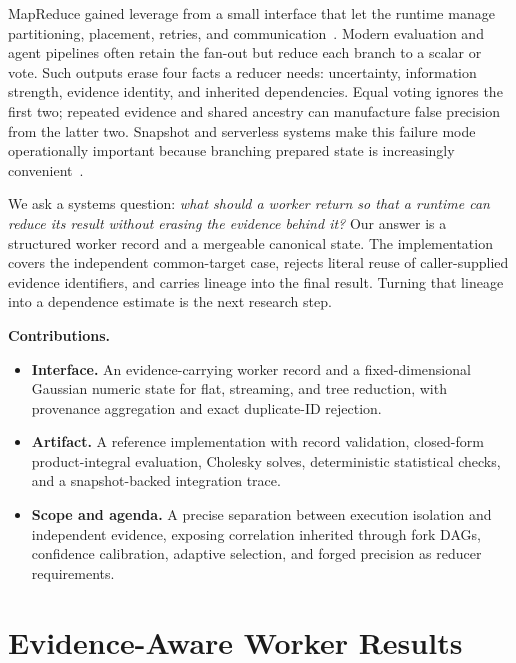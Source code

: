 MapReduce gained leverage from a small interface that let the runtime manage partitioning,
placement, retries, and communication~\cite{dean2004mapreduce}. Modern evaluation and agent
pipelines often retain the fan-out but reduce each branch to a scalar or vote. Such outputs erase
four facts a reducer needs: uncertainty, information strength, evidence identity, and inherited
dependencies. Equal voting ignores the first two; repeated evidence and shared ancestry can
manufacture false precision from the latter two. Snapshot and serverless systems make this
failure mode operationally important because branching prepared state is increasingly
convenient~\cite{agache2020firecracker,ustiugov2021reap,du2020catalyzer}.

We ask a systems question: \emph{what should a worker return so that a runtime can reduce its
result without erasing the evidence behind it?} Our answer is a structured worker record and a
mergeable canonical state. The implementation covers the independent common-target case,
rejects literal reuse of caller-supplied evidence identifiers, and carries lineage into the
final result. Turning that lineage into a dependence estimate is the next research step.

\noindent\textbf{Contributions.}
\begin{itemize}
  \item \textbf{Interface.} An evidence-carrying worker record and a fixed-dimensional Gaussian
  numeric state for flat, streaming, and tree reduction, with provenance aggregation and exact
  duplicate-ID rejection.
  \item \textbf{Artifact.} A reference implementation with record validation, closed-form
  product-integral evaluation, Cholesky solves, deterministic statistical checks, and a
  snapshot-backed integration trace.
  \item \textbf{Scope and agenda.} A precise separation between execution isolation and
  independent evidence, exposing correlation inherited through fork DAGs, confidence
  calibration, adaptive selection, and forged precision as reducer requirements.
\end{itemize}

\section{Evidence-Aware Worker Results}
\label{sec:contract}



